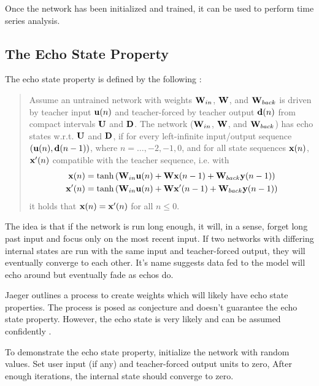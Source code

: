 \documentclass{article}
\begin{document}
Once the network has been initialized and trained, it can be used to perform
time series analysis.

\subsection{The Echo State Property}
\label{sec:eprop}

The echo state property is defined by the following
\cite{jaeger2002tutorial}:

\begin{quote}
    Assume an untrained network with weights $\mathbf{W}_{in}$, $\mathbf{W}$, and $\mathbf{W}_{back}$ is
    driven by teacher input $\mathbf{u}(n)$ and teacher-forced by teacher output
    $\mathbf{d}(n)$ from compact intervals $\mathbf{U}$ and $\mathbf{D}$. The network ($\mathbf{W}_{in}$,
    $\mathbf{W}$, and $\mathbf{W}_{back}$) has echo states w.r.t. $\mathbf{U}$ and $\mathbf{D}$, if for every
    left-infinite input/output sequence $(\mathbf{u}(n), \mathbf{d}(n-1))$, where $n=\dots,
    -2, -1, 0$, and for all state sequences $\mathbf{x}(n)$, $\mathbf{x}'(n)$ compatible
    with the teacher sequence, i.e. with
    \begin{align}
        \mathbf{x}(n) &= \tanh \left(
                \mathbf{W}_{in} \mathbf{u}(n)
                + \mathbf{W} \mathbf{x}(n-1)
                + \mathbf{W}_{back} \mathbf{y}(n-1)
            \right) \\
        \mathbf{x}'(n) &= \tanh \left(
                \mathbf{W}_{in} \mathbf{u}(n)
                + \mathbf{W} \mathbf{x}'(n-1)
                + \mathbf{W}_{back} \mathbf{y}(n-1)
            \right)
    \end{align}
    it holds that $\mathbf{x}(n) = \mathbf{x}'(n)$ for all $n \leq 0$.
\end{quote}

The idea is that if the network is run long enough, it will, in a sense,
forget long past input and focus only on the most recent input. If two
networks with differing internal states are run with the same input and
teacher-forced output, they will eventually converge to each other. It's name
suggests data fed to the model will echo around but eventually fade as echos
do.

Jaeger outlines a process to create weights which will likely have echo state
properties. The process is posed as conjecture and doesn't guarantee the echo
state property. However, the echo state is very likely and can be assumed
confidently \cite{jaeger2002tutorial} \cite{jaeger2007echo}.

To demonstrate the echo state property, initialize the network with random
values. Set user input (if any) and teacher-forced output units to zero,
After enough iterations, the internal state should converge to zero.
\end{document}
